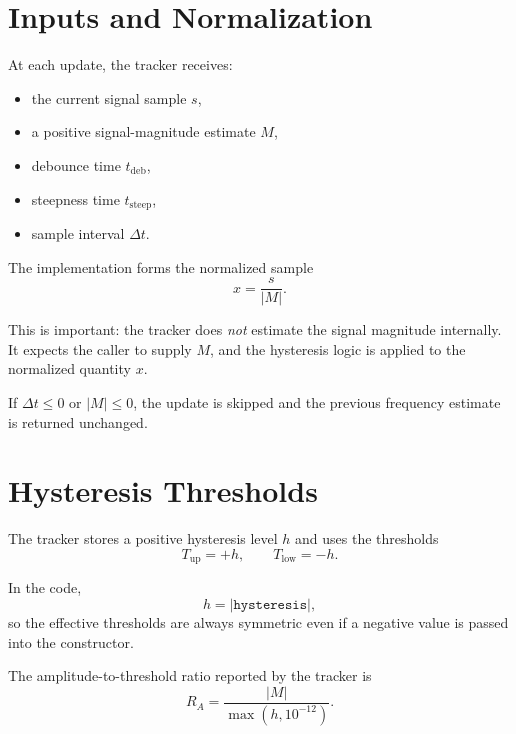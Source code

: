 \documentclass[conference]{IEEEtran}
\begin{document}
    \section{Inputs and Normalization}

    At each update, the tracker receives:
    \begin{itemize}[leftmargin=1.4em]
        \item the current signal sample \(s\),
        \item a positive signal-magnitude estimate \(M\),
        \item debounce time \(t_{\mathrm{deb}}\),
        \item steepness time \(t_{\mathrm{steep}}\),
        \item sample interval \(\Delta t\).
    \end{itemize}

    The implementation forms the normalized sample
    \begin{equation}
        x = \frac{s}{|M|}.
    \end{equation}

    This is important: the tracker does \emph{not} estimate the signal magnitude
    internally. It expects the caller to supply \(M\), and the hysteresis logic is
    applied to the normalized quantity \(x\).

    If \(\Delta t \le 0\) or \(|M| \le 0\), the update is skipped and the previous
    frequency estimate is returned unchanged.

    \section{Hysteresis Thresholds}

    The tracker stores a positive hysteresis level \(h\) and uses the thresholds
    \begin{equation}
        T_{\mathrm{up}} = +h,
        \qquad
        T_{\mathrm{low}} = -h.
    \end{equation}

    In the code,
    \begin{equation}
        h = |\texttt{hysteresis}|,
    \end{equation}
    so the effective thresholds are always symmetric even if a negative value is
    passed into the constructor.

    The amplitude-to-threshold ratio reported by the tracker is
    \begin{equation}
        R_A = \frac{|M|}{\max(h,10^{-12})}.
    \end{equation}
\end{document}
